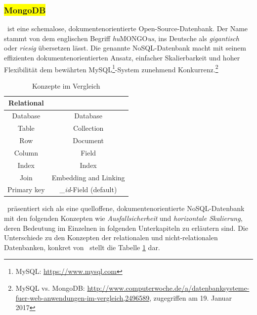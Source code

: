 
\subsubsection{\colorbox{yellow}{MongoDB}}\label{mongo}

\mongo\ ist eine  schemalose, dokumentenorientierte Open-Source-Datenbank. Der Name stammt von dem englischen Begriff \textit{hu}MONGO\textit{us}, ins Deutsche als \textit{gigantisch} oder \textit{riesig} übersetzen lässt. Die genannte NoSQL-Datenbank macht mit seinem effizienten dokumentenorientierten Ansatz, einfacher Skalierbarkeit und hoher Flexibilität dem bewährten MySQL\footnote{MySQL: \url{https://www.mysql.com}}-System zunehmend Konkurrenz.\footnote{MySQL vs. MongoDB: \url{http://www.computerwoche.de/a/datenbanksysteme-fuer-web-anwendungen-im-vergleich,2496589}, zugegriffen am 19. Januar 2017} 


\newcommand*{\head}[1]{\textbf{#1}}%

\begin{table}[h]
\centering
\begin{tabular}{cc}
\toprule 
    \rowcolor{gray!50}
	Relational & \mongo\ \\
	\midrule
	Database &  Database\\
	Table & Collection\\
	Row &  Document\\
	Column &  Field\\
	Index & Index\\
	Join &  Embedding and Linking\\
	Primary key & \textit{\_id}-Field (default)\\
	\bottomrule
\end{tabular}
\caption[Konzepte im Vergleich]{Konzepte im Vergleich}
\label{table:concepts}
\end{table}

\mongo\ präsentiert sich als eine quelloffene, dokumentenorientierte NoSQL-Datenbank mit den folgenden Konzepten wie \textit{Ausfallsicherheit} und \textit{horizontale Skalierung}, deren Bedeutung im Einzelnen in folgenden Unterkapiteln zu erläutern sind.
Die Unterschiede zu den Konzepten der relationalen und nicht-relationalen Datenbanken, konkret von \mongo\ stellt die Tabelle \ref{table:concepts} dar.

